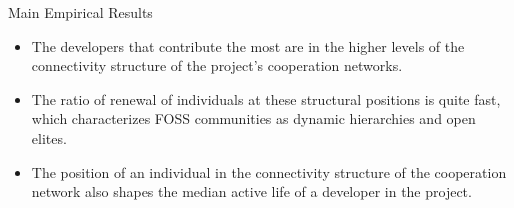\documentclass[ignorenonframetext,red,8pt,notes=hide]{beamer}
\begin{document}
\begin{frame}
\pause


\begin{block}{Main Empirical Results}
\begin{itemize}
\item The developers that contribute the most are in the higher levels of the connectivity structure of the project's cooperation networks.

\item The ratio of renewal of individuals at these structural positions is quite fast, which characterizes FOSS communities as dynamic hierarchies and open elites.

\item The position of an individual in the connectivity structure of the cooperation network also shapes the median active life of a developer in the project.
\end{itemize}
\end{block}


\end{frame}
\end{document}
